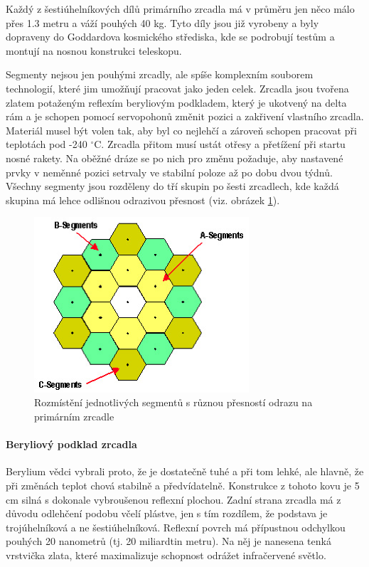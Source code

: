 \documentclass[a4paper,11pt]{article}
\begin{document}
Každý z šestiúhelníkových dílů primárního zrcadla má v průměru jen něco málo přes 1.3 metru a váží pouhých 40 kg. Tyto díly jsou již vyrobeny a byly dopraveny do Goddardova kosmického střediska, kde se podrobují testům a montují na nosnou konstrukci teleskopu.

Segmenty nejsou jen pouhými zrcadly, ale spíše komplexním souborem technologií, které jim umožňují pracovat jako jeden celek. Zrcadla jsou tvořena zlatem potaženým reflexím beryliovým podkladem, který je ukotvený na delta rám a je schopen pomocí servopohonů změnit pozici a zakřivení vlastního zrcadla. Materiál musel být volen tak, aby byl co nejlehčí a zároveň schopen pracovat při teplotách pod -240 $^\circ$C. Zrcadla přitom musí ustát otřesy a přetížení při startu nosné rakety. Na oběžné dráze se po nich pro změnu požaduje, aby nastavené prvky v neměnné pozici setrvaly ve stabilní poloze až po dobu dvou týdnů. Všechny segmenty jsou rozděleny do tří skupin po šesti zrcadlech, kde každá skupina má lehce odlišnou odrazivou přesnost (viz. obrázek \ref{segmenty}). 

\begin{figure}[h]
\begin{center}
\includegraphics[width=8cm]{webbSegmenty.eps}
\caption{Rozmístění jednotlivých segmentů s různou přesností odrazu na primárním zrcadle}
\label{segmenty}
\end{center}
\end{figure}

\paragraph{Beryliový podklad zrcadla}
Berylium vědci vybrali proto, že je dostatečně tuhé a při tom lehké, ale hlavně, že při změnách teplot chová stabilně a předvídatelně. Konstrukce z tohoto kovu je 5 cm silná s dokonale vybroušenou reflexní plochou. Zadní strana zrcadla má z důvodu odlehčení podobu včelí plástve, jen s tím rozdílem, že podstava je trojúhelníková a ne šestiúhelníková.
Reflexní povrch má přípustnou odchylkou pouhých 20 nanometrů (tj. 20 miliardtin metru). Na něj je nanesena tenká vrstvička zlata, které maximalizuje schopnost odrážet infračervené světlo. 
\end{document}
